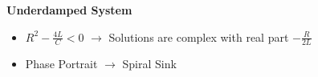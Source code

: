 \documentclass[preview]{standalone}
\begin{document}
\begin{center}
\textbf{Underdamped System}
                    \begin{itemize}
                        \item $R^2 - \frac{4L}{C} < 0$ $\rightarrow$ Solutions are complex with real part $-\frac{R}{2L}$
                        \item Phase Portrait $\rightarrow$ Spiral Sink
                    \end{itemize}
\end{center}
\end{document}

